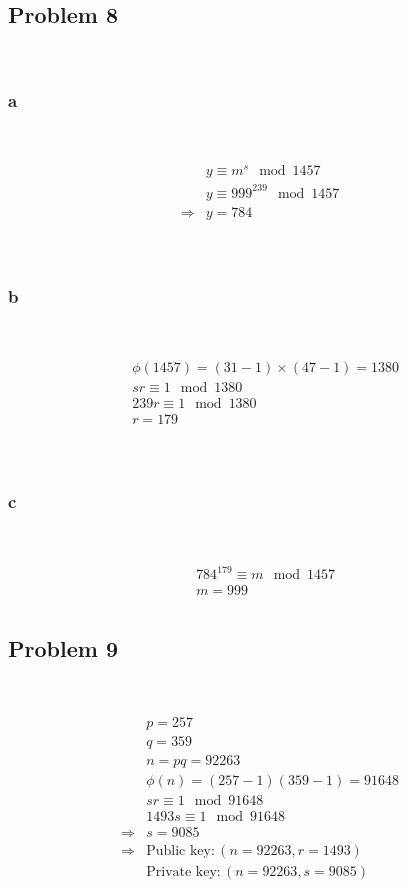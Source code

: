 \documentclass{article}
\begin{document}
~

\subsection*{Problem 8}

~

\subsubsection*{a}

~

\begin{align*}
    &y\equiv m^s\mod 1457\\
    &y\equiv 999^{239}\mod 1457\\
    \Rightarrow&y=784\\
\end{align*}

~

\subsubsection*{b}

~

\begin{align*}
    &\phi(1457)=(31-1)\times(47-1)=1380\\
    &sr\equiv 1\mod 1380\\
    &239r\equiv 1\mod 1380\\
    &r=179\\
\end{align*}

~

\subsubsection*{c}

~

\begin{align*}
    &784^{179}\equiv m\mod 1457\\
    &m= 999\\
\end{align*}

\subsection*{Problem 9}

~

\begin{align*}
    &p=257\\
    &q=359\\
    &n=pq=92263\\
    &\phi(n)=(257-1)(359-1)=91648\\
    &sr\equiv 1\mod 91648\\
    &1493s\equiv 1\mod 91648\\
    \Rightarrow&s=9085\\
    \Rightarrow&\text{Public key}:(n=92263,r=1493)\\
    &\text{Private key}:(n=92263,s=9085)\\
\end{align*}
\end{document}
